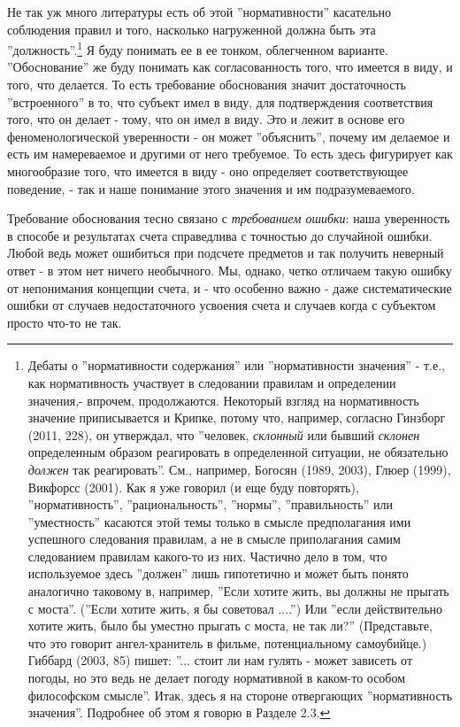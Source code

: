 \documentclass[12pt]{book}
\begin{document}
Не так уж много литературы есть об этой ''нормативности'' касательно соблюдения правил и того, насколько нагруженной должна быть эта ''должность''.\footnote{Дебаты о ''нормативности содержания'' или ''нормативности значения'' - т.е., как нормативность участвует в следовании правилам и определении значения,- впрочем, продолжаются. Некоторый взгляд на нормативность значение приписывается и Крипке, потому что, например, согласно Гинзборг (2011, 228), он утверждал, что ''человек, \textit{склонный} или бывший \textit{склонен} определенным образом реагировать в определенной ситуации, не обязательно \textit{должен} так реагировать''. См., например, Богосян (1989, 2003), Глюер (1999), Викфорсс (2001). Как я уже говорил (и еще буду повторять), ''нормативность'', ''рациональность'', ''нормы'', ''правильность'' или ''уместность'' касаются этой темы только в смысле предполагания ими успешного следования правилам, а не в смысле приполагания самим следованием правилам какого-то из них. Частично дело в том, что используемое здесь ''должен'' лишь гипотетично и может быть понято аналогично таковому в, например, ''Если хотите жить, вы должны не прыгать с моста''. (''Если хотите жить, я бы советовал ....'') Или ''если действительно хотите жить, было бы уместно прыгать с моста, не так ли?'' (Представьте, что это говорит ангел-хранитель в фильме, потенциальному самоубийце.) Гиббард (2003, 85) пишет: ''... стоит ли нам гулять - может зависеть от погоды, но это ведь не делает погоду нормативной в каком-то особом философском смысле''. Итак, здесь я на стороне отвергающих ''нормативность значения''. Подробнее об этом я говорю в Разделе 2.3.} Я буду понимать ее в ее тонком, облегченном варианте. ''Обоснование'' же буду понимать как согласованность того, что имеется в виду, и того, что делается. То есть требование обоснования значит достаточность ''встроенного'' в то, что субъект имел в виду, для подтверждения соответствия того, что он делает - тому, что он имел в виду. Это и лежит в основе его феноменологической уверенности - он может ''объяснить'', почему им делаемое и есть им намереваемое и другими от него требуемое. То есть здесь фигурирует как многообразие того, что имеется в виду - оно определяет соответствующее поведение, - так и наше понимание этого значения и им подразумеваемого.

Требование обоснования тесно связано с \textit{требованием ошибки}: наша уверенность в способе и результатах счета справедлива с точностью до случайной ошибки. Любой ведь может ошибиться при подсчете предметов и так получить неверный ответ - в этом нет ничего необычного. Мы, однако, четко отличаем такую ошибку от непонимания концепции счета, и - что особенно важно - даже систематические ошибки от случаев недостаточного усвоения счета и случаев когда с субъектом просто что-то не так.
\end{document}
